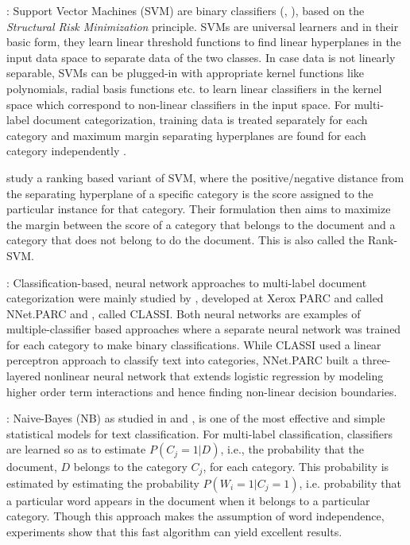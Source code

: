  : Support Vector Machines (SVM) are
binary classifiers (\citep{cortes1995support}, \citep{vapnik2000nature}), 
based on the \emph{Structural Risk Minimization} principle. SVMs are universal learners and in their basic form, they learn linear threshold functions to find 
linear hyperplanes in the input data space to separate data of the two 
classes. In case data is not linearly separable, 
SVMs can be plugged-in with appropriate kernel functions like polynomials,
radial basis functions etc. to learn linear classifiers in the kernel space
which correspond to non-linear classifiers in the input space.
For multi-label document categorization, training data is treated 
separately for each category and maximum margin separating hyperplanes 
are found for each category independently \citep{joachims1998text}.

\citet{elisseeff2001kernel} study a ranking based variant of SVM, where the positive/negative distance from the separating hyperplane of a specific category is the score assigned to the particular instance for that category. Their formulation then aims to maximize the margin between the score of a category that belongs to the document and a category that does not belong to do the document. This is also called the Rank-SVM.

 : Classification-based, neural network 
approaches to multi-label document categorization were mainly studied 
by \citet{wiener1995neural}, developed at Xerox PARC and called NNet.PARC
and \citet{ng1997feature}, called CLASSI. Both neural networks are 
examples of multiple-classifier based approaches where a separate 
neural network was trained for each category to make binary 
classifications. While CLASSI used a linear perceptron approach to 
classify text into categories, NNet.PARC built a three-layered 
nonlinear neural network that extends logistic regression by modeling 
higher order term interactions and hence finding non-linear decision 
boundaries. 

 : Naive-Bayes (NB) as studied in 
\citet{lewis1992representation} and \citet{lewis1994comparison}, is 
one of the most effective and simple statistical models for text 
classification. For multi-label classification, classifiers are 
learned so as to estimate $P(C_{j}=1|D)$, i.e., the probability that 
the document, $D$ belongs to the category $C_{j}$, for each category. 
This probability is estimated by estimating the probability $P(W_{i}=1|
C_{j}=1)$, i.e. probability that a particular word appears in the 
document when it belongs to a particular category. Though this 
approach makes the assumption of word independence, experiments show 
that this fast algorithm can yield excellent results. 

